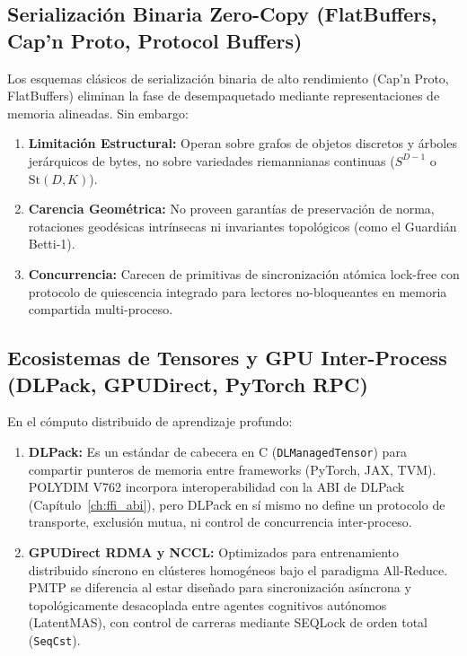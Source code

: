 \subsection{Serialización Binaria Zero-Copy (FlatBuffers, Cap'n Proto, Protocol Buffers)}
Los esquemas clásicos de serialización binaria de alto rendimiento (Cap'n Proto, FlatBuffers) 
eliminan la fase de desempaquetado mediante representaciones de memoria alineadas. Sin embargo:
\begin{enumerate}
    \item \textbf{Limitación Estructural:} Operan sobre grafos de objetos discretos y árboles 
    jerárquicos de bytes, no sobre variedades riemannianas continuas ($S^{D-1}$ o $\mathrm{St}(D, K)$).
    \item \textbf{Carencia Geométrica:} No proveen garantías de preservación de norma, 
    rotaciones geodésicas intrínsecas ni invariantes topológicos (como el Guardián Betti-1).
    \item \textbf{Concurrencia:} Carecen de primitivas de sincronización atómica lock-free 
    con protocolo de quiescencia integrado para lectores no-bloqueantes en memoria compartida multi-proceso.
\end{enumerate}

\subsection{Ecosistemas de Tensores y GPU Inter-Process (DLPack, GPUDirect, PyTorch RPC)}
En el cómputo distribuido de aprendizaje profundo:
\begin{enumerate}
    \item \textbf{DLPack:} Es un estándar de cabecera en C (\texttt{DLManagedTensor}) para compartir 
    punteros de memoria entre frameworks (PyTorch, JAX, TVM). POLYDIM V762 incorpora interoperabilidad 
    con la ABI de DLPack (Capítulo~\ref{ch:ffi_abi}), pero DLPack en sí mismo no define un protocolo 
    de transporte, exclusión mutua, ni control de concurrencia inter-proceso.
    \item \textbf{GPUDirect RDMA y NCCL:} Optimizados para entrenamiento distribuido síncrono en clústeres 
    homogéneos bajo el paradigma All-Reduce. PMTP se diferencia al estar diseñado para sincronización 
    asíncrona y topológicamente desacoplada entre agentes cognitivos autónomos (LatentMAS), con control 
    de carreras mediante SEQLock de orden total (\texttt{SeqCst}).
\end{enumerate}

